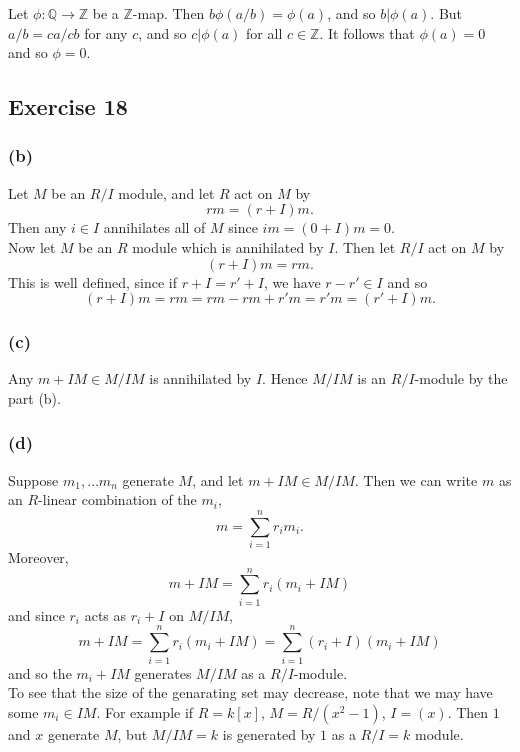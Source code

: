 \documentclass{article}
\theoremstyle{definition}
\newcommand{\Z}{\mathbb{Z}}
\newcommand{\Q}{\mathbb{Q}}
\begin{document}
Let $\phi : \Q \to \Z$ be a $\Z$-map. Then $b\phi(a/b) = \phi(a)$, and so $b |
\phi(a)$. But $a/b = ca/cb$ for any $c$, and so $c | \phi(a)$ for all $c
\in \Z$. It follows that $\phi(a) = 0$ and so $\phi = 0$.

\subsection*{Exercise 18}

\subsubsection*{(b)}

Let $M$ be an $R/I$ module, and let $R$ act on $M$ by 
\[
	rm = (r + I)m.
\] 
Then any $i \in I$ annihilates all of $M$ since $im = (0 + I)m = 0$. \\

Now let $M$ be an $R$ module which is annihilated by $I$. Then let 
$R/I$ act on $M$ by 
\[
	(r + I)m = rm.
\] 
This is well defined, since if $r + I = r' + I$, we have $r - r' \in I$ and so 
\[
	(r + I)m
	=
	rm
	=
	rm - rm + r'm
	=
	r'm
	=
	(r' + I)m.
\] 

\subsubsection*{(c)}

Any $m + IM \in M/IM$ is annihilated by $I$. Hence $M/IM$ is an $R/I$-module by
the part (b).

\subsubsection*{(d)}

Suppose $m_1, \ldots m_n$ generate $M$, and let $m + IM \in M/IM$. Then we can
write $m$ as an $R$-linear combination of the $m_i$,
\[
	m = \sum_{i = 1}^{n} r_i m_i.
\] 
Moreover, 
\[
	m + IM
	=
	\sum_{i = 1}^{n} r_i (m_i + IM)
\] 
and since $r_i$ acts as $r_i + I$ on $M/IM$,
\[
	m + IM
	=
	\sum_{i = 1}^{n} r_i (m_i + IM)
	=
	\sum_{i = 1}^{n} (r_i + I) (m_i + IM)
\]
and so the $m_i + IM$ generates $M/IM$ as a $R/I$-module. \\

To see that the size of the genarating set may decrease, note that we may have
some $m_i \in IM$. For example if $R = k[x]$, $M = R/(x^2 - 1)$, $I = (x)$.
Then $1$ and $x$ generate $M$, but $M/IM = k$ is generated by $1$ as a $R/I =
k$ module.
\end{document}
